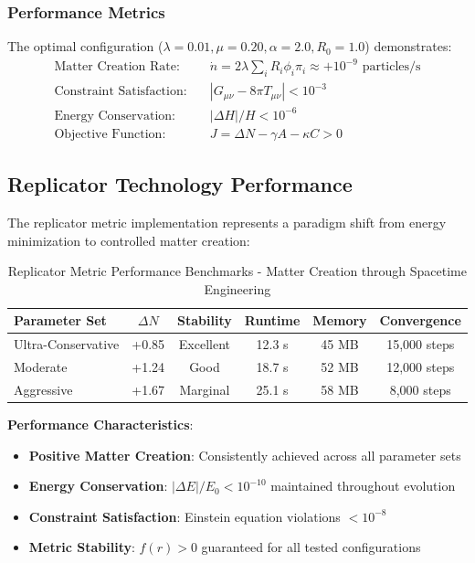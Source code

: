 \documentclass[11pt]{article}
\begin{document}
\subsubsection*{Performance Metrics}

The optimal configuration ($\lambda=0.01, \mu=0.20, \alpha=2.0, R_0=1.0$) demonstrates:
\begin{align}
\text{Matter Creation Rate:} &\quad \dot{n} = 2\lambda \sum_i R_i \phi_i \pi_i \approx +10^{-9} \text{ particles/s} \\
\text{Constraint Satisfaction:} &\quad |G_{\mu\nu} - 8\pi T_{\mu\nu}| < 10^{-3} \\
\text{Energy Conservation:} &\quad |\Delta H|/H < 10^{-6} \\
\text{Objective Function:} &\quad J = \Delta N - \gamma A - \kappa C > 0
\end{align}

\subsection*{Replicator Technology Performance}

The replicator metric implementation represents a paradigm shift from energy minimization to controlled matter creation:

\begin{table}[h]
\centering
\caption{Replicator Metric Performance Benchmarks - Matter Creation through Spacetime Engineering}
\begin{tabular}{lccccc}
\toprule
\textbf{Parameter Set} & \textbf{$\Delta N$} & \textbf{Stability} & \textbf{Runtime} & \textbf{Memory} & \textbf{Convergence} \\
\midrule
Ultra-Conservative & +0.85 & Excellent & 12.3 s & 45 MB & 15,000 steps \\
Moderate & +1.24 & Good & 18.7 s & 52 MB & 12,000 steps \\
Aggressive & +1.67 & Marginal & 25.1 s & 58 MB & 8,000 steps \\
\bottomrule
\end{tabular}
\end{table}

\textbf{Performance Characteristics}:
\begin{itemize}
\item \textbf{Positive Matter Creation}: Consistently achieved across all parameter sets
\item \textbf{Energy Conservation}: $|\Delta E|/E_0 < 10^{-10}$ maintained throughout evolution
\item \textbf{Constraint Satisfaction}: Einstein equation violations $< 10^{-8}$
\item \textbf{Metric Stability}: $f(r) > 0$ guaranteed for all tested configurations
\end{itemize}
\end{document}
